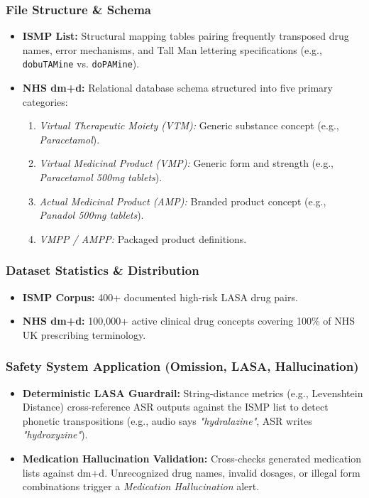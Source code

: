 \subsubsection*{File Structure \& Schema}
\begin{itemize}
    \item \textbf{ISMP List:} Structural mapping tables pairing frequently transposed drug names, error mechanisms, and Tall Man lettering specifications (e.g., \texttt{dobuTAMine} vs. \texttt{doPAMine}).
    \item \textbf{NHS dm+d:} Relational database schema structured into five primary categories:
    \begin{enumerate}
        \item \textit{Virtual Therapeutic Moiety (VTM):} Generic substance concept (e.g., \textit{Paracetamol}).
        \item \textit{Virtual Medicinal Product (VMP):} Generic form and strength (e.g., \textit{Paracetamol 500mg tablets}).
        \item \textit{Actual Medicinal Product (AMP):} Branded product concept (e.g., \textit{Panadol 500mg tablets}).
        \item \textit{VMPP / AMPP:} Packaged product definitions.
    \end{enumerate}
\end{itemize}

\subsubsection*{Dataset Statistics \& Distribution}
\begin{itemize}
    \item \textbf{ISMP Corpus:} 400+ documented high-risk LASA drug pairs.
    \item \textbf{NHS dm+d:} 100,000+ active clinical drug concepts covering 100\% of NHS UK prescribing terminology.
\end{itemize}

\subsubsection*{Safety System Application (Omission, LASA, Hallucination)}
\begin{itemize}
    \item \textbf{Deterministic LASA Guardrail:} String-distance metrics (e.g., Levenshtein Distance) cross-reference ASR outputs against the ISMP list to detect phonetic transpositions (e.g., audio says \textit{"hydralazine"}, ASR writes \textit{"hydroxyzine"}).
    \item \textbf{Medication Hallucination Validation:} Cross-checks generated medication lists against dm+d. Unrecognized drug names, invalid dosages, or illegal form combinations trigger a \textit{Medication Hallucination} alert.
\end{itemize}

